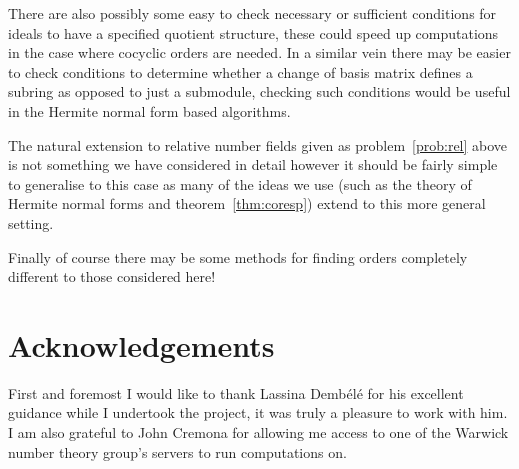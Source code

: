 \documentclass[12pt,a4paper,abstracton,bibtotoc]{scrreprt}
\theoremstyle{definition}
\begin{document}
There are also possibly some easy to check necessary or sufficient conditions for ideals to have a specified quotient structure, these could speed up computations in the case where cocyclic orders are needed.
In a similar vein there may be easier to check conditions to determine whether a change of basis matrix defines a subring as opposed to just a submodule, checking such conditions would be useful in the Hermite normal form based algorithms.

The natural extension to relative number fields given as problem~\ref{prob:rel} above is not something we have considered in detail however it should be fairly simple to generalise to this case as many of the ideas we use (such as the theory of Hermite normal forms and theorem~\ref{thm:coresp}) extend to this more general setting.

Finally of course there may be some methods for finding orders completely different to those considered here!

\section{Acknowledgements}
First and foremost I would like to thank Lassina Demb\'el\'e for his excellent guidance while I undertook the project, it was truly a pleasure to work with him.
I am also grateful to John Cremona for allowing me access to one of the Warwick number theory group's servers to run computations on.


 
%

%

\nocite{*}


\end{document}

